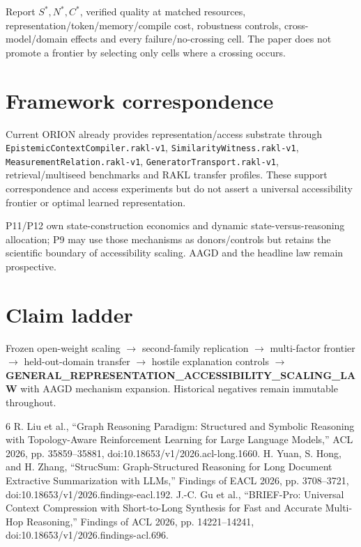 \documentclass[11pt]{article}
\begin{document}
Report $S^*,N^*,C^*$, verified quality at matched resources, representation/token/memory/compile cost, robustness controls, cross-model/domain effects and every failure/no-crossing cell. The paper does not promote a frontier by selecting only cells where a crossing occurs.

\section{Framework correspondence}
Current ORION already provides representation/access substrate through \texttt{EpistemicContextCompiler.rakl-v1}, \texttt{SimilarityWitness.rakl-v1}, \texttt{MeasurementRelation.rakl-v1}, \texttt{GeneratorTransport.rakl-v1}, retrieval/multiseed benchmarks and RAKL transfer profiles. These support correspondence and access experiments but do not assert a universal accessibility frontier or optimal learned representation.

P11/P12 own state-construction economics and dynamic state-versus-reasoning allocation; P9 may use those mechanisms as donors/controls but retains the scientific boundary of accessibility scaling. AAGD and the headline law remain prospective.

\section{Claim ladder}
Frozen open-weight scaling $\rightarrow$ second-family replication $\rightarrow$ multi-factor frontier $\rightarrow$ held-out-domain transfer $\rightarrow$ hostile explanation controls $\rightarrow$ \textbf{GENERAL\_REPRESENTATION\_ACCESSIBILITY\_SCALING\_LAW} with AAGD mechanism expansion. Historical negatives remain immutable throughout.

\begin{thebibliography}{6}
 R. Liu et al., ``Graph Reasoning Paradigm: Structured and Symbolic Reasoning with Topology-Aware Reinforcement Learning for Large Language Models,'' ACL 2026, pp. 35859--35881, doi:10.18653/v1/2026.acl-long.1660.
 H. Yuan, S. Hong, and H. Zhang, ``StrucSum: Graph-Structured Reasoning for Long Document Extractive Summarization with LLMs,'' Findings of EACL 2026, pp. 3708--3721, doi:10.18653/v1/2026.findings-eacl.192.
 J.-C. Gu et al., ``BRIEF-Pro: Universal Context Compression with Short-to-Long Synthesis for Fast and Accurate Multi-Hop Reasoning,'' Findings of ACL 2026, pp. 14221--14241, doi:10.18653/v1/2026.findings-acl.696.
\end{thebibliography}
\end{document}
